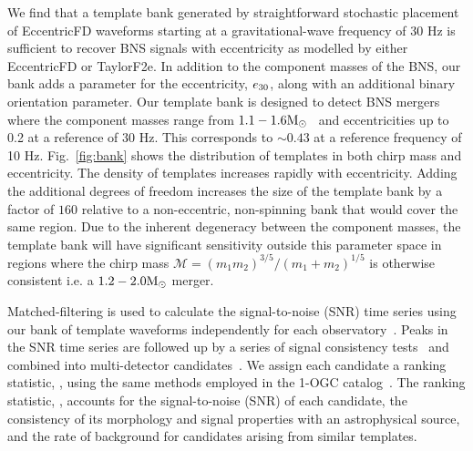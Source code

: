 We find that a template bank generated by straightforward stochastic placement of EccentricFD waveforms starting at a gravitational-wave frequency of 30 Hz is sufficient to recover BNS signals with eccentricity as modelled by either EccentricFD or TaylorF2e. In addition to the component masses of the BNS, our bank adds a parameter for the eccentricity, $e_{30}$, along with an additional binary orientation parameter. Our template bank is designed to detect BNS mergers where the component masses range from $1.1-1.6 \mathrm{M}_{\odot}$~\cite{Ozel:2016oaf} and eccentricities up to 0.2 at a reference of 30 Hz. This corresponds to $\sim0.43$ at a reference frequency of 10 Hz. Fig.~\ref{fig:bank} shows the distribution of templates in both chirp mass and eccentricity. The density of templates increases rapidly with eccentricity. Adding the additional degrees of freedom increases the size of the template bank by a factor of $160$ relative to a non-eccentric, non-spinning bank that would cover the same region. Due to the inherent degeneracy between the component masses, the template bank will have significant sensitivity outside this parameter space in regions where the chirp mass $\mathcal{M} = (m_1m_2)^{3/5} / (m_1+m_2)^{1/5}$ is otherwise consistent i.e. a $1.2 - 2.0\mathrm{M}_{\odot}$ merger. 

Matched-filtering is used to calculate the signal-to-noise (SNR) time series using our bank of template waveforms independently for each observatory~\cite{Allen:2005fk}. Peaks in the SNR time series are followed up by a series of signal consistency tests~\cite{Nitz:2017lco,Allen:2004gu} and combined into multi-detector candidates~\cite{Usman:2015kfa,Nitz:2017svb}. We assign each candidate a ranking statistic, \rankingstat, using the same methods employed in the 1-OGC catalog~\cite{Nitz:2018imz}. The ranking statistic, \rankingstat, accounts for the signal-to-noise (SNR) of each candidate, the consistency of its morphology and signal properties with an astrophysical source, and the rate of background for candidates arising from similar templates.

